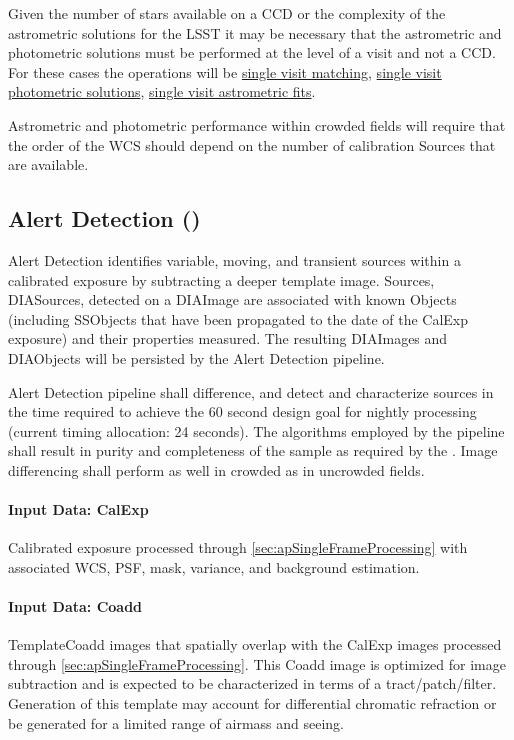 Given the number of stars available on a CCD or the complexity of the astrometric solutions for the LSST it may be necessary that the astrometric and photometric solutions must be performed at the level of a visit and not a CCD.  For these cases the operations will be \hyperref[sec:acSingleVisitReferenceMatching]{single visit matching},   \hyperref[sec:acSingleCCDPhotometricFit]{single visit photometric solutions}, \hyperref[sec:acSingleVisitAstrometricFit]{single visit astrometric fits}.

Astrometric and photometric performance within crowded fields will require that the order of the WCS should depend on the number of calibration Sources that are available.

\subsection{Alert Detection (\wbsDiffim)}
\label{sec:apAlertDetection}

Alert Detection identifies variable, moving, and transient sources within a calibrated exposure by subtracting a deeper template image. Sources, DIASources, detected on a DIAImage are associated with known Objects (including SSObjects that have been propagated to the date of the CalExp exposure) and their properties measured. The resulting DIAImages and DIAObjects will be persisted by the Alert Detection pipeline.

Alert Detection pipeline shall difference, and detect and characterize sources in the time required to achieve the 60 second design goal for nightly processing (current timing allocation: 24 seconds). The algorithms employed by the pipeline shall result in purity and completeness of the sample as required by the \DMSR\@. Image differencing shall perform as well in crowded as in uncrowded fields. 


\paragraph{Input Data: CalExp}

Calibrated exposure processed through \ref{sec:apSingleFrameProcessing} with associated WCS, PSF, mask, variance, and background estimation.

\paragraph{Input Data: Coadd}

TemplateCoadd images that spatially overlap with the CalExp images processed through \ref{sec:apSingleFrameProcessing}. This Coadd image is optimized for image subtraction and is expected to be characterized in terms of a tract/patch/filter. Generation of this template may account for differential chromatic refraction or be generated for a limited range of airmass and seeing.


